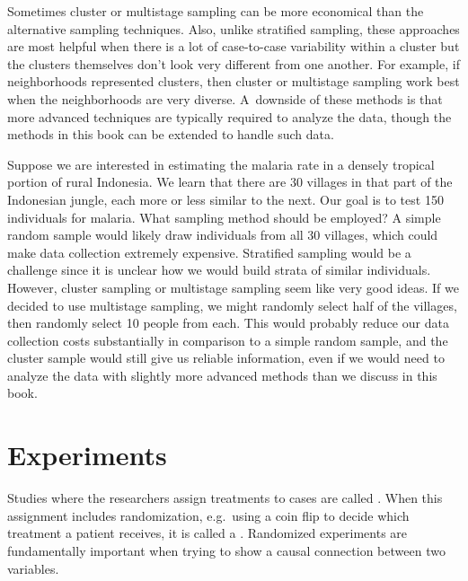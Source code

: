 Sometimes cluster or multistage sampling can be more economical
than the alternative sampling techniques.
Also, unlike stratified sampling, these approaches are most
helpful when there is a lot of case-to-case variability within
a cluster but the clusters themselves don't look very different
from one another.
For example, if neighborhoods represented clusters, then cluster
or multistage sampling work best when the neighborhoods are very
diverse.
A~downside of these methods is that more advanced techniques
are typically required to analyze the data, though the methods
in this book can be extended to handle such data.

\begin{examplewrap}
\begin{nexample}{Suppose we are interested in estimating
    the malaria rate in a densely tropical portion of rural
    Indonesia.
    We learn that there are 30 villages in that part of the
    Indonesian jungle, each more or less similar to the next.
    Our goal is to test 150 individuals for malaria.
    What sampling method should be employed?}
  A simple random sample would likely draw individuals from
  all 30 villages, which could make data collection extremely
  expensive.
  Stratified sampling would be a challenge since it is
  unclear how we would build strata of similar individuals.
  However, cluster sampling or multistage sampling seem like
  very good ideas.
  If we decided to use multistage sampling, we might randomly
  select half of the villages, then randomly select
  10 people from each.
  This would probably reduce our data collection costs
  substantially in comparison to a simple random sample,
  and the cluster sample would still give us reliable
  information, even if we would need to analyze the data
  with slightly more advanced methods than we discuss
  in this book.
\end{nexample}
\end{examplewrap}


\section{Experiments}
\label{experimentsSection}

Studies where the researchers assign treatments to cases are called . When this assignment includes randomization, e.g.~using a coin flip to decide which treatment a patient receives, it is called a . Randomized experiments are fundamentally important when trying to show a causal connection between two variables.



